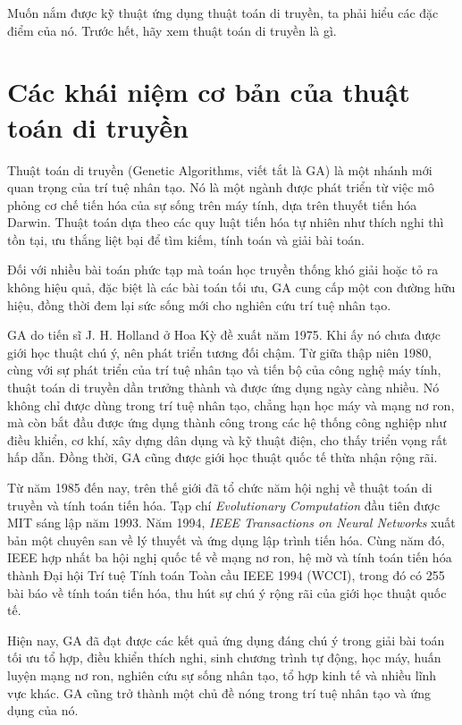 \documentclass[11pt]{article}
\begin{document}
Muốn nắm được kỹ thuật ứng dụng thuật toán di truyền, ta phải hiểu các đặc
điểm của nó. Trước hết, hãy xem thuật toán di truyền là gì.

\section{Các khái niệm cơ bản của thuật toán di truyền}

Thuật toán di truyền (Genetic Algorithms, viết tắt là GA) là một nhánh mới
quan trọng của trí tuệ nhân tạo. Nó là một ngành được phát triển từ việc mô
phỏng cơ chế tiến hóa của sự sống trên máy tính, dựa trên thuyết tiến hóa
Darwin. Thuật toán dựa theo các quy luật tiến hóa tự nhiên như thích nghi thì
tồn tại, ưu thắng liệt bại để tìm kiếm, tính toán và giải bài toán.

Đối với nhiều bài toán phức tạp mà toán học truyền thống khó giải hoặc tỏ ra
không hiệu quả, đặc biệt là các bài toán tối ưu, GA cung cấp một con đường
hữu hiệu, đồng thời đem lại sức sống mới cho nghiên cứu trí tuệ nhân tạo.

GA do tiến sĩ J. H. Holland ở Hoa Kỳ đề xuất năm 1975. Khi ấy nó chưa được
giới học thuật chú ý, nên phát triển tương đối chậm. Từ giữa thập niên 1980,
cùng với sự phát triển của trí tuệ nhân tạo và tiến bộ của công nghệ máy
tính, thuật toán di truyền dần trưởng thành và được ứng dụng ngày càng nhiều.
Nó không chỉ được dùng trong trí tuệ nhân tạo, chẳng hạn học máy và mạng nơ
ron, mà còn bắt đầu được ứng dụng thành công trong các hệ thống công nghiệp
như điều khiển, cơ khí, xây dựng dân dụng và kỹ thuật điện, cho thấy triển
vọng rất hấp dẫn. Đồng thời, GA cũng được giới học thuật quốc tế thừa nhận
rộng rãi.

Từ năm 1985 đến nay, trên thế giới đã tổ chức năm hội nghị về thuật toán di
truyền và tính toán tiến hóa. Tạp chí \textit{Evolutionary Computation} đầu
tiên được MIT sáng lập năm 1993. Năm 1994, \textit{IEEE Transactions on Neural
Networks} xuất bản một chuyên san về lý thuyết và ứng dụng lập trình tiến
hóa. Cùng năm đó, IEEE hợp nhất ba hội nghị quốc tế về mạng nơ ron, hệ mờ và
tính toán tiến hóa thành Đại hội Trí tuệ Tính toán Toàn cầu IEEE 1994
(WCCI), trong đó có 255 bài báo về tính toán tiến hóa, thu hút sự chú ý rộng
rãi của giới học thuật quốc tế.

Hiện nay, GA đã đạt được các kết quả ứng dụng đáng chú ý trong giải bài toán
tối ưu tổ hợp, điều khiển thích nghi, sinh chương trình tự động, học máy,
huấn luyện mạng nơ ron, nghiên cứu sự sống nhân tạo, tổ hợp kinh tế và nhiều
lĩnh vực khác. GA cũng trở thành một chủ đề nóng trong trí tuệ nhân tạo và
ứng dụng của nó.
\end{document}
